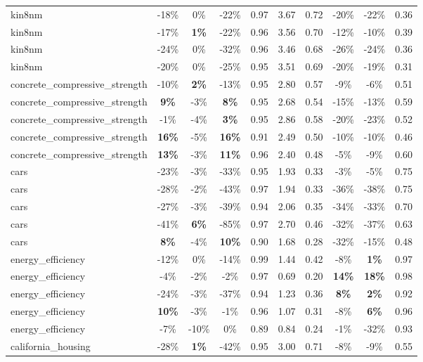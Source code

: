 \begin{table}[!htbp]
\begin{small}
\begin{sc}
{\begin{tabular}{lccccccccc}
kin8nm & -18\% & 0\% & -22\% & 0.97 & 3.67 & 0.72 & -20\% & -22\% & 0.36 \\
kin8nm & -17\% & \textbf{1\%} & -22\% & 0.96 & 3.56 & 0.70 & -12\% & -10\% & 0.39 \\
kin8nm & -24\% & 0\% & -32\% & 0.96 & 3.46 & 0.68 & -26\% & -24\% & 0.36 \\
kin8nm & -20\% & 0\% & -25\% & 0.95 & 3.51 & 0.69 & -20\% & -19\% & 0.31 \\
concrete\_compressive\_strength & -10\% & \textbf{2\%} & -13\% & 0.95 & 2.80 & 0.57 & -9\% & -6\% & 0.51 \\
concrete\_compressive\_strength & \textbf{9\%} & -3\% & \textbf{8\%} & 0.95 & 2.68 & 0.54 & -15\% & -13\% & 0.59 \\
concrete\_compressive\_strength & -1\% & -4\% & \textbf{3\%} & 0.95 & 2.86 & 0.58 & -20\% & -23\% & 0.52 \\
concrete\_compressive\_strength & \textbf{16\%} & -5\% & \textbf{16\%} & 0.91 & 2.49 & 0.50 & -10\% & -10\% & 0.46 \\
concrete\_compressive\_strength & \textbf{13\%} & -3\% & \textbf{11\%} & 0.96 & 2.40 & 0.48 & -5\% & -9\% & 0.60 \\
cars & -23\% & -3\% & -33\% & 0.95 & 1.93 & 0.33 & -3\% & -5\% & 0.75 \\
cars & -28\% & -2\% & -43\% & 0.97 & 1.94 & 0.33 & -36\% & -38\% & 0.75 \\
cars & -27\% & -3\% & -39\% & 0.94 & 2.06 & 0.35 & -34\% & -33\% & 0.70 \\
cars & -41\% & \textbf{6\%} & -85\% & 0.97 & 2.70 & 0.46 & -32\% & -37\% & 0.63 \\
cars & \textbf{8\%} & -4\% & \textbf{10\%} & 0.90 & 1.68 & 0.28 & -32\% & -15\% & 0.48 \\
energy\_efficiency & -12\% & 0\% & -14\% & 0.99 & 1.44 & 0.42 & -8\% & \textbf{1\%} & 0.97 \\
energy\_efficiency & -4\% & -2\% & -2\% & 0.97 & 0.69 & 0.20 & \textbf{14\%} & \textbf{18\%} & 0.98 \\
energy\_efficiency & -24\% & -3\% & -37\% & 0.94 & 1.23 & 0.36 & \textbf{8\%} & \textbf{2\%} & 0.92 \\
energy\_efficiency & \textbf{10\%} & -3\% & -1\% & 0.96 & 1.07 & 0.31 & -8\% & \textbf{6\%} & 0.96 \\
energy\_efficiency & -7\% & -10\% & 0\% & 0.89 & 0.84 & 0.24 & -1\% & -32\% & 0.93 \\
california\_housing & -28\% & \textbf{1\%} & -42\% & 0.95 & 3.00 & 0.71 & -8\% & -9\% & 0.55 \\

\end{tabular}}
\end{sc}
\end{small}
\end{table}
